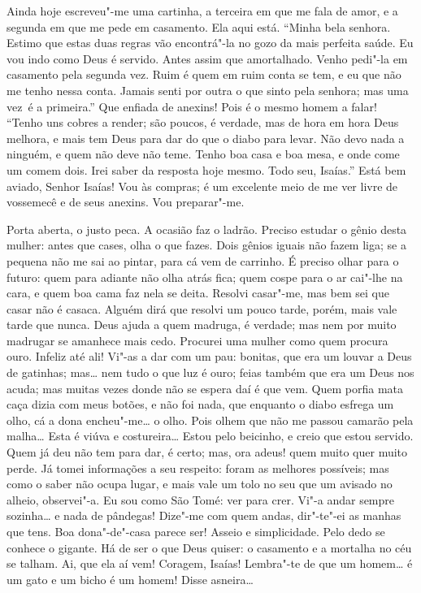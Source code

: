 Ainda hoje escreveu"-me uma cartinha, a terceira em que me fala de amor, e a
segunda em que me pede em casamento. 
Ela aqui está.  “Minha bela senhora. Estimo que estas duas regras vão
encontrá"-la no gozo da mais perfeita saúde. Eu vou indo como Deus é servido.
Antes assim que amortalhado. Venho pedi"-la em casamento pela segunda vez. Ruim é
quem em ruim conta se tem, e eu que não me tenho nessa conta. Jamais senti por
outra o que sinto pela senhora; mas uma \mbox{vez é} a primeira.” 
Que enfiada de anexins! Pois é o mesmo homem a falar!  “Tenho uns cobres a render; são poucos, é verdade, mas de hora em hora
Deus melhora, e mais tem Deus para dar do que o diabo para levar. Não devo nada a ninguém, e quem não
deve não teme. Tenho boa casa e boa mesa, e onde come um comem dois. Irei saber
da resposta hoje mesmo. Todo seu,
Isaías.”  Está bem aviado, Senhor Isaías!  Vou às
compras; é um excelente meio de me ver livre de vossemecê e de seus
anexins. Vou preparar"-me. 


\stagedir{\textsc{[Isaías]}}

  Porta
aberta, o justo peca.
 A ocasião faz o ladrão. Preciso estudar o
gênio desta mulher: antes que cases, olha o que fazes. Dois gênios iguais não
fazem liga; se a pequena não me sai ao pintar, para cá vem de carrinho. É
preciso olhar para o futuro: quem para adiante não olha atrás fica; quem cospe
para o ar cai"-lhe na cara, e quem boa cama faz nela se deita. Resolvi casar"-me,
mas bem sei que casar não é casaca. Alguém dirá que resolvi um pouco tarde,
porém, mais vale tarde que nunca. Deus ajuda a quem madruga, é verdade; mas nem
por muito madrugar se amanhece mais cedo. Procurei uma mulher como quem procura
ouro. Infeliz até ali! Vi"-as a dar com um pau: bonitas, que era um louvar a Deus
de gatinhas; mas\ldots{} nem tudo o que luz é ouro; feias também que era um Deus
nos acuda; mas muitas vezes donde não se espera daí é que vem. Quem porfia mata
caça dizia com meus botões, e não foi nada, que enquanto o diabo esfrega um
olho, cá a dona encheu"-me\ldots{} o olho. Pois olhem que não me passou camarão
pela malha\ldots{} Esta é viúva e costureira\ldots{} Estou pelo beicinho, e creio
que estou servido. Quem já deu não tem para dar, é certo; mas, ora adeus!
quem muito quer muito perde. Já tomei informações a seu respeito: foram as
melhores possíveis; mas como o saber não ocupa lugar, e mais vale um tolo no seu
que um avisado no alheio, observei"-a. Eu sou como
São Tomé: ver para crer. Vi"-a andar sempre sozinha\ldots{} e nada de pândegas!
Dize"-me com quem andas, dir"-te"-ei as manhas que tens.
 Boa dona"-de"-casa parece ser! Asseio e simplicidade.
Pelo dedo se conhece o gigante. Há de ser o que Deus quiser: o casamento e a
mortalha no céu se talham.  Ai, que ela aí vem!
 Coragem, Isaías! Lembra"-te de que um homem\ldots{}
 é um gato e um bicho é um homem!
Disse asneira\ldots{}


